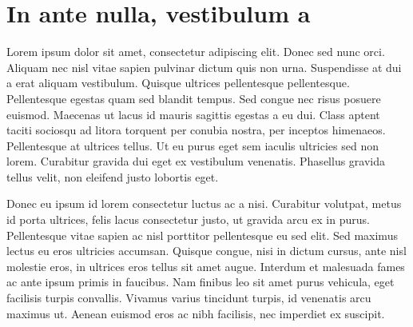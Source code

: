 %
%
%
%

\chapter{In ante nulla, vestibulum a}
\label{cha:intro}

Lorem ipsum dolor sit amet, consectetur adipiscing elit. Donec sed nunc orci. Aliquam
nec nisl vitae sapien pulvinar dictum quis non urna. Suspendisse at dui a erat
aliquam vestibulum. Quisque ultrices pellentesque pellentesque. Pellentesque
egestas quam sed blandit tempus. Sed congue nec risus posuere euismod. Maecenas
ut lacus id mauris sagittis egestas a eu dui. Class aptent taciti sociosqu ad litora
torquent per conubia nostra, per inceptos himenaeos. Pellentesque at ultrices tellus.
Ut eu purus eget sem iaculis ultricies sed non lorem. Curabitur gravida dui eget
ex vestibulum venenatis. Phasellus gravida tellus velit, non eleifend justo lobortis
eget. \cite{coulouris}

Donec eu ipsum id lorem consectetur luctus ac a nisi. Curabitur volutpat, metus id
porta ultrices, felis lacus consectetur justo, ut gravida arcu ex in purus.
Pellentesque vitae sapien ac nisl porttitor pellentesque eu sed elit. Sed maximus
lectus eu eros ultricies accumsan. Quisque congue, nisi in dictum cursus, ante
nisl molestie eros, in ultrices eros tellus sit amet augue. Interdum et
malesuada fames ac ante ipsum primis in faucibus. Nam finibus leo sit amet purus
vehicula, eget facilisis turpis convallis. Vivamus varius tincidunt turpis, id
venenatis arcu maximus ut. Aenean euismod eros ac nibh facilisis, nec imperdiet
ex suscipit. \cite{dalal}

